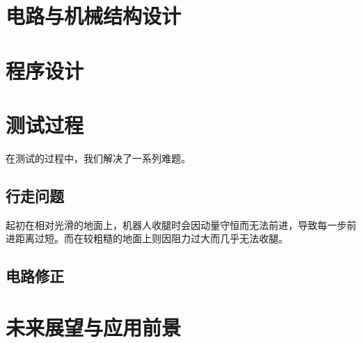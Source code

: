 \section{电路与机械结构设计}

\section{程序设计}

\section{测试过程}
    \hspace{1.5em}在测试的过程中，我们解决了一系列难题。
    \subsection{行走问题}
    \hspace{1.5em}起初在相对光滑的地面上，机器人收腿时会因动量守恒而无法前进，导致每一步前进距离过短。而在较粗糙的地面上则因阻力过大而几乎无法收腿。

    \subsection{电路修正}
    \hspace{1.5em}

\section{未来展望与应用前景}




